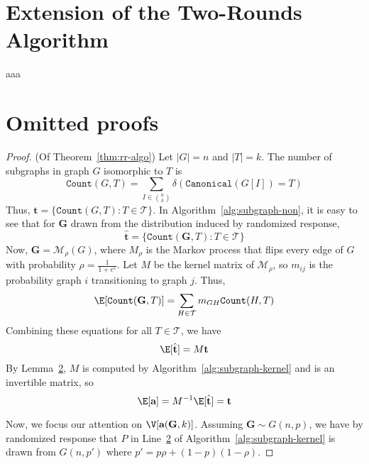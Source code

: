 \appendix

\section{Extension of the Two-Rounds Algorithm}
\label{sec:modified_two_rounds}
aaa

\section{Omitted proofs}
\begin{proof}(Of Theorem~\ref{thm:rr-algo})
  Let $|G| = n$ and $|T|=k$.
  The number of subgraphs in graph $G$ isomorphic to $T$ is
  \[
    \texttt{Count}(G,T) = 
    \sum_{I \in {n \choose k}} \delta(\texttt{Canonical}(G[I]) = T)
  \]
  Thus, $\textbf{t} = \{\texttt{Count}(G,T) : T \in \mathcal{T}\}$.
  In Algorithm~\ref{alg:subgraph-non}, it is easy to see that for $\textbf{G}$ 
  drawn from the distribution induced by randomized response,
  \[
    \hat{\textbf{t}} = \{\texttt{Count}(\textbf{G},T) : T \in \mathcal{T}\}
  \]
  Now, $\textbf{G} = \mathcal{M}_\rho(G)$, where $M_\rho$ is the Markov process that flips
  every edge of $G$ with probability $\rho = \frac{1}{1+e^{\varepsilon}}$. Let
  $M$ be the kernel matrix of $\mathcal{M}_\rho$, so $m_{ij}$ is the probability graph $i$
  transitioning to graph $j$. Thus,
  \[
    \E[\texttt{Count}(\textbf{G},T)] = \sum_{H \in \mathcal{T}} m_{GH}
    \texttt{Count}(H,T)
  \]
  Combining these equations for all $T \in \mathcal{T}$, we have
  \[
    \E[\hat{\textbf{t}}] = M \textbf{t}
  \]
  By Lemma~\ref{}, $M$ is computed by Algorithm~\ref{alg:subgraph-kernel} and is an 
  invertible matrix, so
  \[
    \E[\textbf{a}] = M^{-1}\E[\hat{\textbf{t}}] = \textbf{t}
  \]
  
  Now, we focus our attention on $\V[\textbf{a}(\textbf{G}, k)]$. Assuming
  $\textbf{G} \sim G(n,p)$, we have by randomized response that $P$ in
  Line~\ref{} of Algorithm~\ref{alg:subgraph-kernel} is drawn from $G(n, p')$
  where $p' = p\rho + (1-p)(1-\rho)$.
\end{proof}
